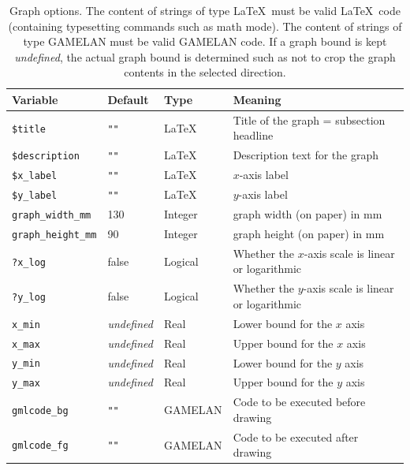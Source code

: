 \documentclass[12pt]{book}
\newcommand{\ttt}[1]{\texttt{#1}}
\begin{document}
\begin{table}
  \caption{Graph options.  The content of strings of type \LaTeX\ must be
    valid \LaTeX\ code (containing typesetting commands such as math mode).
    The content of strings of type GAMELAN must be valid GAMELAN code.
    If a graph bound is kept \emph{undefined}, the actual graph bound is
    determined such as not to crop the graph contents in the selected
    direction.}
  \label{tab:graph-options}

  \begin{center}
    \begin{tabular}{|l|l|l|l|}
      \hline
      Variable & Default & Type & Meaning
      \\
      \hline\hline
      \ttt{\$title}  & \ttt{""} & \LaTeX &
        Title of the graph = subsection headline
      \\
      \hline
      \ttt{\$description}  & \ttt{""} &  \LaTeX &
        Description text for the graph
      \\
      \hline
      \ttt{\$x\_label} & \ttt{""} & \LaTeX &
        $x$-axis label
      \\
      \hline
      \ttt{\$y\_label} & \ttt{""} & \LaTeX &
        $y$-axis label
      \\
      \hline
      \ttt{graph\_width\_mm} & 130 & Integer &
        graph width (on paper) in mm
      \\
      \hline
      \ttt{graph\_height\_mm} & 90 & Integer &
        graph height (on paper) in mm
      \\
      \hline
      \ttt{?x\_log} & false & Logical &
        Whether the $x$-axis scale is linear or logarithmic
      \\
      \hline
      \ttt{?y\_log} & false & Logical &
        Whether the $y$-axis scale is linear or logarithmic
      \\
      \hline
      \ttt{x\_min} & \emph{undefined} & Real &
        Lower bound for the $x$ axis
      \\
      \hline
      \ttt{x\_max} & \emph{undefined} & Real &
        Upper bound for the $x$ axis
      \\
      \hline
      \ttt{y\_min} & \emph{undefined} & Real &
        Lower bound for the $y$ axis
      \\
      \hline
      \ttt{y\_max} & \emph{undefined} & Real &
        Upper bound for the $y$ axis
      \\
      \hline
      \ttt{gmlcode\_bg} & \ttt{""} & GAMELAN &
         Code to be executed before drawing
      \\
      \hline
      \ttt{gmlcode\_fg} & \ttt{""} & GAMELAN &
         Code to be executed after drawing
      \\
      \hline
    \end{tabular}
  \end{center}
\end{table}
\end{document}
